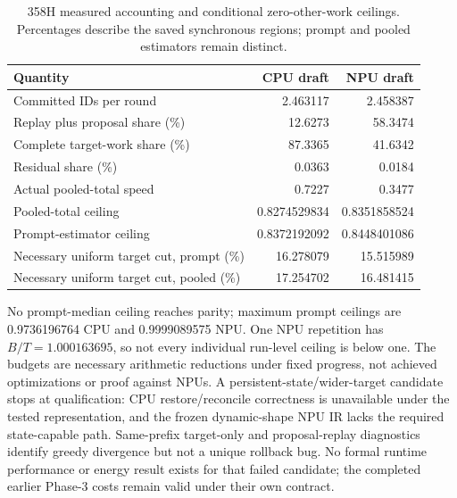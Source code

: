 \begin{table}[ht]\centering\small
\caption{358H measured accounting and conditional zero-other-work ceilings. Percentages describe the saved synchronous regions; prompt and pooled estimators remain distinct.}
\label{tab:358h_accounting}
\begin{tabular}{@{}lrr@{}}\toprule
Quantity & CPU draft & NPU draft\\\midrule
Committed IDs per round & 2.463117 & 2.458387\\
Replay plus proposal share (\%) & 12.6273 & 58.3474\\
Complete target-work share (\%) & 87.3365 & 41.6342\\
Residual share (\%) & 0.0363 & 0.0184\\
Actual pooled-total speed & 0.7227 & 0.3477\\
Pooled-total ceiling & 0.8274529834 & 0.8351858524\\
Prompt-estimator ceiling & 0.8372192092 & 0.8448401086\\
Necessary uniform target cut, prompt (\%) & 16.278079 & 15.515989\\
Necessary uniform target cut, pooled (\%) & 17.254702 & 16.481415\\\bottomrule
\end{tabular}
\end{table}

No prompt-median ceiling reaches parity; maximum prompt ceilings are 0.9736196764 CPU and 0.9999089575 NPU. One NPU repetition has $B/T=1.000163695$, so not every individual run-level ceiling is below one. The budgets are necessary arithmetic reductions under fixed progress, not achieved optimizations or proof against NPUs. A persistent-state/wider-target candidate stops at qualification: CPU restore/reconcile correctness is unavailable under the tested representation, and the frozen dynamic-shape NPU IR lacks the required state-capable path. Same-prefix target-only and proposal-replay diagnostics identify greedy divergence but not a unique rollback bug. No formal runtime performance or energy result exists for that failed candidate; the completed earlier Phase-3 costs remain valid under their own contract.
